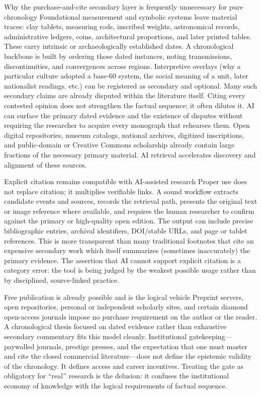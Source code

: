 Why the purchase-and-cite secondary layer is frequently unnecessary for pure chronology
Foundational measurement and symbolic systems leave material traces: clay tablets, measuring rods, inscribed weights, astronomical records, administrative ledgers, coins, architectural proportions, and later printed tables. These carry intrinsic or archaeologically established dates.
A chronological backbone is built by ordering those dated instances, noting transmissions, discontinuities, and convergences across regions. Interpretive overlays (why a particular culture adopted a base-60 system, the social meaning of a unit, later nationalist readings, etc.) can be registered as secondary and optional.
Many such secondary claims are already disputed within the literature itself. Citing every contested opinion does not strengthen the factual sequence; it often dilutes it. AI can surface the primary dated evidence and the existence of disputes without requiring the researcher to acquire every monograph that rehearses them.
Open digital repositories, museum catalogs, national archives, digitized inscriptions, and public-domain or Creative Commons scholarship already contain large fractions of the necessary primary material. AI retrieval accelerates discovery and alignment of these sources.

Explicit citation remains compatible with AI-assisted research
Proper use does not replace citation; it multiplies verifiable links. A sound workflow extracts candidate events and sources, records the retrieval path, presents the original text or image reference where available, and requires the human researcher to confirm against the primary or high-quality open edition. The output can include precise bibliographic entries, archival identifiers, DOI/stable URLs, and page or tablet references. This is more transparent than many traditional footnotes that cite an expensive secondary work which itself summarizes (sometimes inaccurately) the primary evidence. The assertion that AI cannot support explicit citation is a category error: the tool is being judged by the weakest possible usage rather than by disciplined, source-linked practice.

Free publication is already possible and is the logical vehicle
Preprint servers, open repositories, personal or independent scholarly sites, and certain diamond open-access journals impose no purchase requirement on the author or the reader. A chronological thesis focused on dated evidence rather than exhaustive secondary commentary fits this model cleanly. Institutional gatekeeping—paywalled journals, prestige presses, and the expectation that one must master and cite the closed commercial literature—does not define the epistemic validity of the chronology. It defines access and career incentives. Treating the gate as obligatory for “real” research is the delusion: it confuses the institutional economy of knowledge with the logical requirements of factual sequence.

